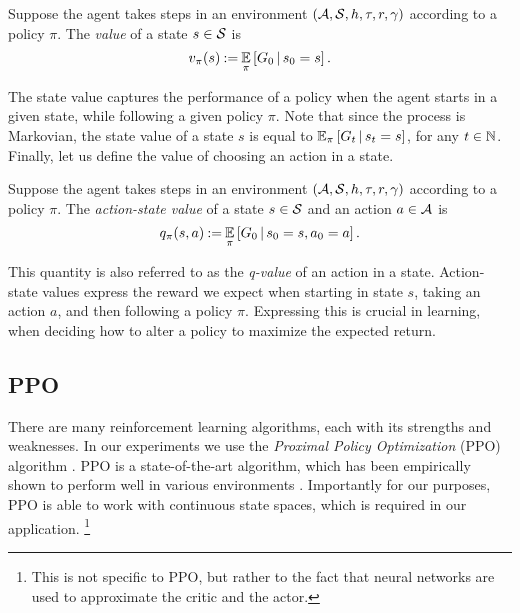 \begin{defi}\label{def:state-value}
	Suppose the agent takes steps in an environment $ \left( \mathcal{A}, \mathcal{S}, h, \tau, r, \gamma \right) $ according to a policy $ \pi $.
	The \emph{value} of a state $ s \in\mathcal{S} $ is \[
		v_{\pi}\!\left(s\right) \mathbin{:=} \operatorname*{\mathbb{E}}_\pi \left[ G_0 \,|\, s_0 = s \right].
	\]
\end{defi}

The state value captures the performance of a policy when the agent starts in a given state, while following a given policy $\pi$.
Note that since the process is Markovian, the state value of a state $ s $ is equal to $ \operatorname*{\mathbb{E}}_\pi \left[ G_t \,|\, s_t = s \right] $, for any $ t \in \mathbb{N} $.
Finally, let us define the value of choosing an action in a state.

\begin{defi}
	Suppose the agent takes steps in an environment $ \left( \mathcal{A}, \mathcal{S}, h, \tau, r, \gamma \right) $ according to a policy $ \pi $.
	The \emph{action-state value} of a state $ s \in\mathcal{S}$ and an action $ a \in \mathcal{A} $ is \[
		q_\pi\!\left(s, a\right) \mathbin{:=} \operatorname*{\mathbb{E}}_\pi \left[ G_0 \,|\, s_0 = s, a_0 = a \right].
	\]
\end{defi}

This quantity is also referred to as the \emph{q-value} of an action in a state.
Action-state values express the reward we expect when starting in state $ s $, taking an action $ a $, and then following a policy $ \pi $.
Expressing this is crucial in learning, when deciding how to alter a policy to maximize the expected return.

\subsection{PPO}
\label{sec:prel-ppo}

There are many reinforcement learning algorithms, each with its strengths and weaknesses.
In our experiments we use the \emph{Proximal Policy Optimization} (PPO) algorithm \citep{schulman2017proximal}.
PPO is a state-of-the-art algorithm, which has been empirically shown to perform well in various environments \citep{conf/nips/Ouyang0JAWMZASR22,Berner2019Dota2W,conf/iclr/BakerKMWPMM20}.
Importantly for our purposes, PPO is able to work with continuous state spaces, which is required in our application.%
\footnote{This is not specific to PPO, but rather to the fact that neural networks are used to approximate the critic and the actor.}

